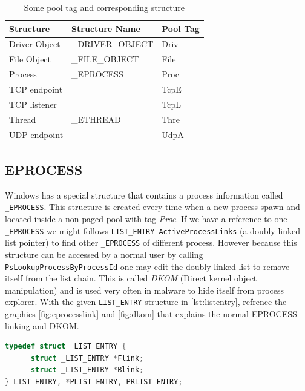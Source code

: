 \begin{center}
\begin{table}[h]
\begin{tabular}{|l|l|l|}
\hline
Structure     & Structure Name   & Pool Tag \\ \hline
Driver Object & \_DRIVER\_OBJECT & Driv     \\ \hline
File Object   & \_FILE\_OBJECT   & File     \\ \hline
Process       & \_EPROCESS       & Proc     \\ \hline
TCP endpoint  &                  & TcpE     \\ \hline
TCP listener  &                  & TcpL     \\ \hline
Thread        & \_ETHREAD        & Thre     \\ \hline
UDP endpoint  &                  & UdpA     \\ \hline
\end{tabular}
\caption{Some pool tag and corresponding structure}
\label{tab:pooltag}
\end{table}
\end{center}

\subsection[EPROCESS]{EPROCESS}

Windows has a special structure that contains a process information called \texttt{\_EPROCESS}. This structure is created every time when a new process spawn and located inside a non-paged pool with tag \textit{Proc}. If we have a reference to one \texttt{\_EPROCESS} we might follows \texttt{LIST\_ENTRY ActiveProcessLinks} (a doubly linked list pointer) to find other \texttt{\_EPROCESS} of different process. However because this structure can be accessed by a normal user by calling \texttt{PsLookupProcessByProcessId} one may edit the doubly linked list to remove itself from the list chain. This is called \textit{DKOM} (Direct kernel object manipulation) and is used very often in malware to hide itself from process explorer. With the given \texttt{LIST\_ENTRY} structure in \ref{lst:listentry}, refrence the graphics \ref{fig:eprocesslink} and \ref{fig:dkom} that explains the normal EPROCESS linking and DKOM.

\begin{lstlisting}[language=c,caption={LIST\_ENTRY},label={lst:listentry}]
typedef struct _LIST_ENTRY {
      struct _LIST_ENTRY *Flink;
      struct _LIST_ENTRY *Blink;
} LIST_ENTRY, *PLIST_ENTRY, PRLIST_ENTRY;
\end{lstlisting}

